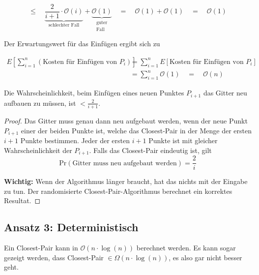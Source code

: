 \documentclass{scrartcl}%
\begin{document}
    \begin{equation*}
        \leq \quad \underbrace{\frac{2}{i+1} \cdot \mathcal{O}(i)}_{\text{schlechter Fall}} + \underbrace{\mathcal{O}(1)}_{\substack{\text{guter} \\ \text{Fall}}}
        \quad = \quad \mathcal{O}(1) + \mathcal{O}(1)
        \quad = \quad \mathcal{O}(1)
    \end{equation*}

    Der Erwartungswert für das Einfügen ergibt sich zu

    \begin{align*}
        E\left[ \sum^{n}_{i=1}(\text{Kosten für Einfügen von }P_i)\right] &= \sum^{n}_{i=1}E[\text{Kosten für Einfügen von }P_i] \\\nonumber
        &= \sum^{n}_{i=1} \mathcal{O}(1) \quad = \quad \mathcal{O}(n)
    \end{align*}

    \begin{satz}
        Die Wahrscheinlichkeit, beim Einfügen eines neuen Punktes $P_{i+1}$ das Gitter neu aufbauen zu müssen,
        ist $< \frac{2}{i+1}$.
    \end{satz}
    \begin{proof}
        Das Gitter muss genau dann neu aufgebaut werden, wenn der neue Punkt $P_{i+1}$
        einer der beiden Punkte ist, welche das Closest-Pair in der Menge der ersten $i+1$ Punkte bestimmen.
        Jeder der ersten $i+1$ Punkte ist mit gleicher Wahrscheinlichkeit der $P_{i+1}$.
        Falls das Closest-Pair eindeutig ist, gilt
        \begin{equation*}
            \text{Pr}(\text{Gitter muss neu aufgebaut werden}) = \frac{2}{i}
        \end{equation*}

        \textbf{\textsf{Wichtig:}} Wenn der Algorithmus länger braucht, hat das nichts mit der Eingabe zu tun.
        Der randomisierte Closest-Pair-Algorithmus berechnet  ein korrektes Resultat.
    \end{proof}

    \subsection*{Ansatz 3: Deterministisch}
    Ein Closest-Pair kann in $\mathcal{O}(n \cdot \log(n))$ berechnet werden.
    Es kann sogar gezeigt werden, dass Closest-Pair $\in \Omega(n \cdot \log(n))$, es also gar nicht besser geht.
\end{document}
